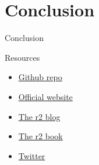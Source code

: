 \documentclass{beamer}
\begin{document}
\section*{Conclusion}
\begin{frame}{Conclusion}
	\begin{center}
	\end{center}
\end{frame}

\begin{frame}{Resources}
	\begin{itemize}
		\item \href{https://github.com/radare/radare2}{Github repo}
		\item \href{http://rada.re}{Official website}
		\item \href{http://radare.today}{The r2 blog}
		\item \href{http://maijin.github.io/radare2book/}{The r2 book}
		\item \href{https://twitter.com/radareorg}{Twitter}
	\end{itemize}
\end{frame}
\end{document}
